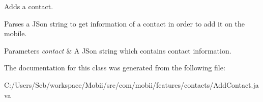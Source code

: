 Adds a contact. 

Parses a J\-Son string to get information of a contact in order to add it on the mobile. 
\begin{DoxyParams}{Parameters}
{\em contact} & A J\-Son string which contains contact information. \\
\hline
\end{DoxyParams}


The documentation for this class was generated from the following file\-:\begin{DoxyCompactItemize}
\item 
C\-:/\-Users/\-Seb/workspace/\-Mobii/src/com/mobii/features/contacts/Add\-Contact.\-java\end{DoxyCompactItemize}
